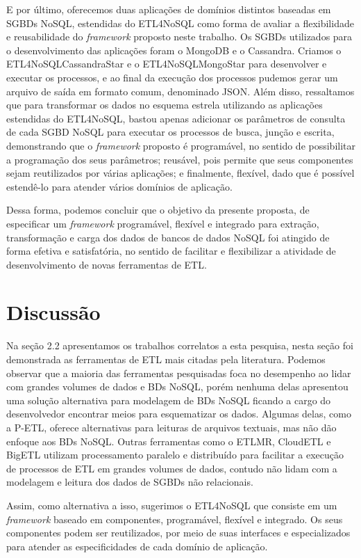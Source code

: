 E por último, oferecemos duas aplicações de domínios distintos baseadas em SGBDs NoSQL, estendidas do ETL4NoSQL como forma de avaliar a flexibilidade e reusabilidade do \textit{framework} proposto neste trabalho. Os SGBDs utilizados para o desenvolvimento das aplicações foram o MongoDB e o Cassandra. Criamos o ETL4NoSQLCassandraStar e o ETL4NoSQLMongoStar para desenvolver e executar os processos, e ao final da execução dos processos pudemos gerar um arquivo de saída em formato comum, denominado JSON. Além disso, ressaltamos que para transformar os dados no esquema estrela utilizando as aplicações estendidas do ETL4NoSQL, bastou apenas adicionar os parâmetros de consulta de cada SGBD NoSQL para executar os processos de busca, junção e escrita, demonstrando que o \textit{framework} proposto é programável, no sentido de possibilitar a programação dos seus parâmetros; reusável, pois permite que seus componentes sejam reutilizados por várias aplicações; e finalmente, flexível, dado que é possível estendê-lo para atender vários domínios de aplicação. 

Dessa forma, podemos concluir que o objetivo da presente proposta, de especificar um \textit{framework} programável, flexível e integrado para extração, transformação e carga dos dados de bancos de dados NoSQL foi atingido de forma efetiva e satisfatória, no sentido de facilitar e flexibilizar a atividade de desenvolvimento de novas ferramentas de ETL.

\section{Discussão}

Na seção 2.2 apresentamos os trabalhos correlatos a esta pesquisa, nesta seção foi demonstrada as ferramentas de ETL mais citadas pela literatura. Podemos observar que a maioria das ferramentas pesquisadas foca no desempenho ao lidar com grandes volumes de dados e BDs NoSQL, porém nenhuma delas apresentou uma solução alternativa para modelagem de BDs NoSQL ficando a cargo do desenvolvedor encontrar meios para esquematizar os dados. Algumas delas, como a P-ETL, oferece alternativas para leituras de arquivos textuais, mas não dão enfoque aos BDs NoSQL.  Outras ferramentas como o ETLMR, CloudETL e BigETL utilizam processamento paralelo e distribuído para facilitar a execução de processos de ETL em grandes volumes de dados, contudo não lidam com a modelagem e leitura dos dados de SGBDs não relacionais.

Assim, como alternativa a isso, sugerimos o ETL4NoSQL que consiste em um \textit{framework} baseado em componentes, programável, flexível e integrado. Os seus componentes podem ser reutilizados, por meio de suas interfaces e especializados para atender as especificidades de cada domínio de aplicação.


